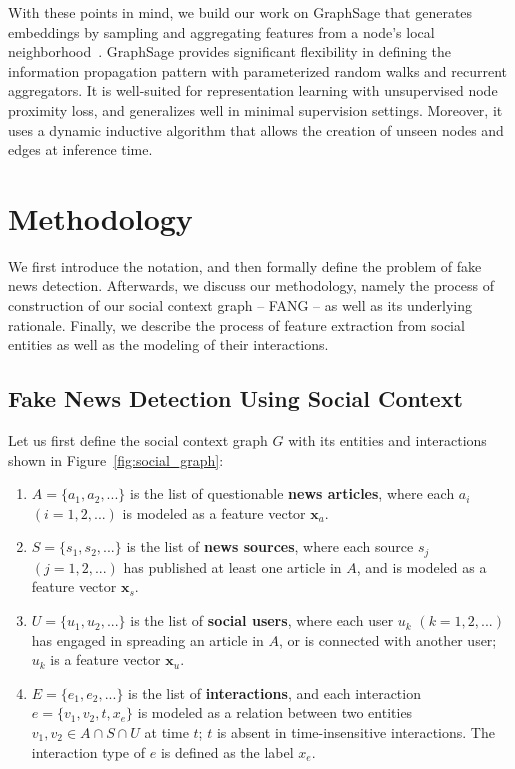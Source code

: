 \documentclass[sigconf]{acmart}
\theoremstyle{definition}
\theoremstyle{hypothesis}
\begin{document}
With these points in mind, we build our work on GraphSage that generates embeddings by sampling and aggregating features from a node's local neighborhood~\cite{Hamilton2017InductiveRL}. 
GraphSage provides significant flexibility in defining the information propagation pattern with parameterized random walks and recurrent aggregators. It is well-suited for representation learning with unsupervised node proximity loss, and generalizes well in minimal supervision settings. Moreover, it uses a dynamic inductive algorithm that allows the creation of unseen nodes and edges at inference time.

\section{Methodology}

We first introduce the notation, and then formally define the problem of fake news detection. Afterwards, we discuss our methodology, namely the process of construction of our social context graph -- FANG -- as well as its underlying rationale. 
Finally, we describe the process of feature extraction from social entities as well as the modeling of their interactions. 

\subsection{Fake News Detection Using Social Context}
Let us first define the social context graph $G$ with 
its entities and interactions shown in Figure~\ref{fig:social_graph}:
\begin{enumerate}
    \item $A=\{a_1, a_2,...\}$ is the list of questionable \textbf{news articles}, 
    where each $a_{i}$ $(i=1,2,...)$ is modeled as a feature vector $\boldsymbol{x}_{a}$.
    \item $S=\{s_1, s_2,...\}$ is the list of \textbf{news sources}, where each source $s_j$ $(j=1,2,...)$ has published at least one article in $A$, and is modeled as a feature vector $\boldsymbol{x}_{s}$.
    \item $U=\{u_1, u_2,...\}$ is the list of \textbf{social users}, where each user $u_{k}$ $(k=1,2,...)$ has engaged in spreading an article in $A$, or is connected with another user; $u_{k}$ is a feature vector $\boldsymbol{x}_{u}$.
    \item $E=\{e_1, e_2,...\}$ is the list of {\bf interactions}, and each interaction $e=\{v_1, v_2, t, x_e\}$ is modeled as a relation between two entities $v_1, v_2\in A\cap S\cap U$ at time $t$;
    $t$ is absent in time-insensitive interactions. The interaction type of $e$ is defined as the label $x_{e}$.
\end{enumerate}
\end{document}
